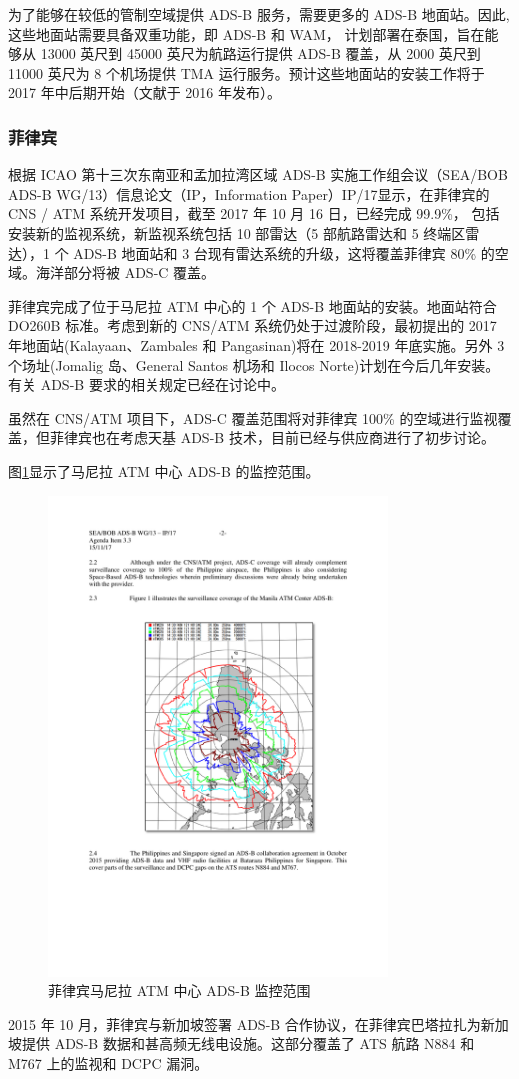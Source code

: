 
为了能够在较低的管制空域提供 ADS-B 服务，需要更多的 ADS-B 地面站。因此,这些地面站需要具备双重功能，即 ADS-B 和 WAM， 计划部署在泰国，旨在能够从 13000 英尺到 45000 英尺为航路运行提供 ADS-B 覆盖，从 2000 英尺到 11000 英尺为 8 个机场提供 TMA 运行服务。预计这些地面站的安装工作将于 2017 年中后期开始（文献于 2016 年发布）。

\subsubsection{菲律宾}

根据 ICAO 第十三次东南亚和孟加拉湾区域 ADS-B 实施工作组会议（SEA/BOB ADS-B WG/13）信息论文（IP，Information Paper）IP/17显示，在菲律宾的 CNS / ATM 系统开发项目，截至 2017 年 10 月 16 日，已经完成 99.9\%， 包括安装新的监视系统，新监视系统包括 10 部雷达（5 部航路雷达和 5 终端区雷达），1 个 ADS-B 地面站和 3 台现有雷达系统的升级，这将覆盖菲律宾 80\% 的空域。海洋部分将被 ADS-C 覆盖。

菲律宾完成了位于马尼拉 ATM 中心的 1 个 ADS-B 地面站的安装。地面站符合 DO260B 标准。考虑到新的 CNS/ATM 系统仍处于过渡阶段，最初提出的 2017 年地面站(Kalayaan、Zambales 和 Pangasinan)将在 2018-2019 年底实施。另外 3 个场址(Jomalig 岛、General Santos 机场和 Ilocos Norte)计划在今后几年安装。有关 ADS-B 要求的相关规定已经在讨论中。

虽然在 CNS/ATM 项目下，ADS-C 覆盖范围将对菲律宾 100\% 的空域进行监视覆盖，但菲律宾也在考虑天基 ADS-B 技术，目前已经与供应商进行了初步讨论。

图\ref{fig:phillipine}显示了马尼拉 ATM 中心 ADS-B 的监控范围。

\begin{figure}[!htb]
\centering
\includegraphics[width=9cm]{pic/phillipine.pdf}
\caption{菲律宾马尼拉 ATM 中心 ADS-B 监控范围\protect\footnotemark}
\label{fig:phillipine}
\end{figure}


2015 年 10 月，菲律宾与新加坡签署 ADS-B 合作协议，在菲律宾巴塔拉扎为新加坡提供 ADS-B 数据和甚高频无线电设施。这部分覆盖了 ATS 航路 N884 和 M767 上的监视和 DCPC 漏洞。



